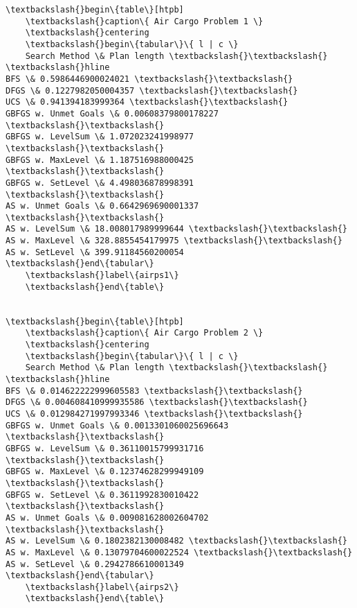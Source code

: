 \documentclass[11pt]{article}
\begin{document}
    \begin{Verbatim}[commandchars=\\\{\}]
\textbackslash{}begin\{table\}[htpb]
    \textbackslash{}caption\{ Air Cargo Problem 1 \}
    \textbackslash{}centering
    \textbackslash{}begin\{tabular\}\{ l | c \}
    Search Method \& Plan length \textbackslash{}\textbackslash{} \textbackslash{}hline 
BFS \& 0.5986446900024021 \textbackslash{}\textbackslash{}
DFGS \& 0.1227982050004357 \textbackslash{}\textbackslash{}
UCS \& 0.941394183999364 \textbackslash{}\textbackslash{}
GBFGS w. Unmet Goals \& 0.00608379800178227 \textbackslash{}\textbackslash{}
GBFGS w. LevelSum \& 1.072023241998977 \textbackslash{}\textbackslash{}
GBFGS w. MaxLevel \& 1.187516988000425 \textbackslash{}\textbackslash{}
GBFGS w. SetLevel \& 4.498036878998391 \textbackslash{}\textbackslash{}
AS w. Unmet Goals \& 0.6642969690001337 \textbackslash{}\textbackslash{}
AS w. LevelSum \& 18.008017989999644 \textbackslash{}\textbackslash{}
AS w. MaxLevel \& 328.8855454179975 \textbackslash{}\textbackslash{}
AS w. SetLevel \& 399.91184560200054
\textbackslash{}end\{tabular\}
    \textbackslash{}label\{airps1\}
    \textbackslash{}end\{table\}

    
\textbackslash{}begin\{table\}[htpb]
    \textbackslash{}caption\{ Air Cargo Problem 2 \}
    \textbackslash{}centering
    \textbackslash{}begin\{tabular\}\{ l | c \}
    Search Method \& Plan length \textbackslash{}\textbackslash{} \textbackslash{}hline 
BFS \& 0.014622222999605583 \textbackslash{}\textbackslash{}
DFGS \& 0.004608410999935586 \textbackslash{}\textbackslash{}
UCS \& 0.012984271997993346 \textbackslash{}\textbackslash{}
GBFGS w. Unmet Goals \& 0.0013301060025696643 \textbackslash{}\textbackslash{}
GBFGS w. LevelSum \& 0.36110015799931716 \textbackslash{}\textbackslash{}
GBFGS w. MaxLevel \& 0.12374628299949109 \textbackslash{}\textbackslash{}
GBFGS w. SetLevel \& 0.3611992830010422 \textbackslash{}\textbackslash{}
AS w. Unmet Goals \& 0.009081628002604702 \textbackslash{}\textbackslash{}
AS w. LevelSum \& 0.1802382130008482 \textbackslash{}\textbackslash{}
AS w. MaxLevel \& 0.13079704600022524 \textbackslash{}\textbackslash{}
AS w. SetLevel \& 0.2942786610001349
\textbackslash{}end\{tabular\}
    \textbackslash{}label\{airps2\}
    \textbackslash{}end\{table\}


\end{Verbatim}
\end{document}

